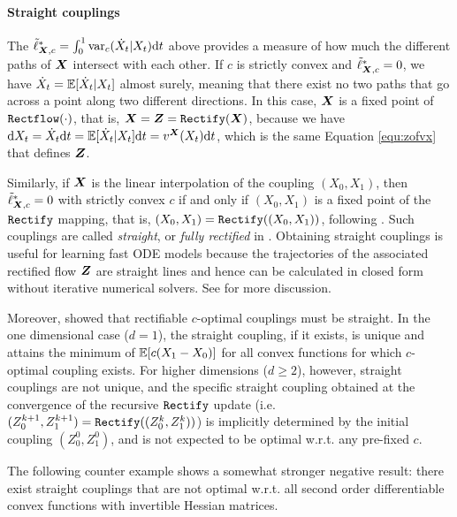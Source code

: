\paragraph{Straight couplings} 
The $\tilde \ell^*_{{\boldsymbol{X}},c}=\int_0^1\mathrm{var}_c(\dot X_t|X_t)\mathrm{d}t $ above 
provides a measure of how much the different paths of ${{\boldsymbol{X}}} $ intersect with each other. 
If $c$ is strictly convex and 
$\tilde \ell^*_{{\boldsymbol{X}},c} = 0$, we have $\dot X_t = \mathbb{E}[\dot X_t|X_t]$ almost surely, 
meaning that there exist no two paths that go across a point along two different directions. 
In this case, ${\boldsymbol{X}}$ is a 
fixed point of $\mathtt{Rectflow}(\cdot)$, that is, ${\boldsymbol{X}} = {\boldsymbol{Z}} = \mathtt{Rectify}({\boldsymbol{X}})$, 
because we have 
$\mathrm{d} X_t =\dot X_t \mathrm{d} t = \mathbb{E}[\dot X_t |X_t]  \mathrm{d}t = v^{{\boldsymbol{X}}}(X_t ) \mathrm{d}t $, which is the same  Equation \eqref{equ:zofvx} that defines ${\boldsymbol{Z}}$. 


Similarly, if ${\boldsymbol{X}} $ is the linear interpolation of the coupling $(X_0,X_1)$, then 
$\tilde \ell^*_{{{\boldsymbol{X}}},c} =0$ with strictly convex $c$ if and only if $(X_0,X_1)$ is a fixed point of the $\mathtt{Rectify}$ mapping, that is, $(X_0,X_1) = \mathtt{Rectify}((X_0,X_1))$, 
following 
\cite{rectified}. 
Such couplings are called \emph{straight}, or \emph{fully rectified} in \cite{rectified}.  Obtaining straight couplings 
is useful for learning fast ODE models 
because the trajectories of the associated  rectified flow ${\boldsymbol{Z}}$ are straight lines and hence can be calculated in closed form without iterative numerical solvers. See \cite{rectified} for more discussion.  %


Moreover, \cite{rectified} showed that 
rectifiable $c$-optimal couplings must be straight. 
In the one dimensional case ($d=1$), 
the straight coupling, if it exists, is unique and attains the minimum of $\mathbb{E}[c(X_1-X_0)]$ for all convex functions for which $c$-optimal coupling exists. For higher dimensions ($d\geq 2$), however, 
straight couplings are not unique, and the specific straight coupling 
obtained at the convergence of the recursive $\mathtt{Rectify}$ update  (i.e. $(Z_0^{k+1},Z_1^{k+1})=\mathtt{Rectify}((Z_0^{k},Z_1^{k}))$) is implicitly determined by the initial coupling $(Z_0^0,Z_1^0)$, 
and  is not expected to be optimal w.r.t. any pre-fixed $c$. 

The following counter example shows a somewhat stronger negative result: 
there exist straight couplings 
that are not optimal w.r.t. all second order differentiable convex functions with invertible Hessian matrices. 


